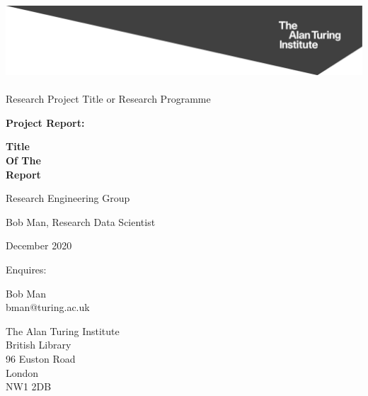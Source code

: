 \begin{titlepage}
    
    {\includegraphics[width=1.15\textwidth,set height=2.9cm,left=\textwidth]{branding/banner.png}}
    
    \vspace*{1cm}
    
    \LARGE    
    \noindent Research Project Title or Research Programme    
    
    \vspace{2cm}

    \titlecolor
    \Huge
    {\fontfamily{\titlefont}\selectfont %
    \noindent\textbf{Project Report:}
    
    \noindent \textbf{Title \\ Of The \\ Report}
        
    \vspace{1cm}
    \Large
    \noindent Research Engineering Group

    \noindent Bob Man, Research Data Scientist
    
    \normalsize 
    \noindent December 2020
    }
    
    \normalsize
    \color{black}
    \vspace{3.5cm}
    \noindent Enquires:
    
    \noindent Bob Man \\
   bman@turing.ac.uk
    
    \noindent The Alan Turing Institute \\
    British Library \\
    96 Euston Road \\
    London \\
    NW1 2DB
    
\end{titlepage}